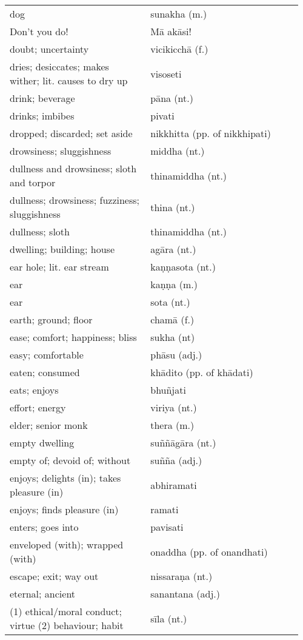 \documentclass[a5paper]{memoir}
\begin{document}
\begin{longtable}{L{0.48\linewidth} L{0.48\linewidth} H}
dog & sunakha (m.) & \\
Don't you do! & Mā akāsi! & \\
doubt; uncertainty & vicikicchā (f.) & \\
dries; desiccates; makes wither; lit. causes to dry up & visoseti & \\
drink; beverage & pāna (nt.) & \\
drinks; imbibes & pivati & \\
dropped; discarded; set aside & nikkhitta (pp. of nikkhipati) & \\
drowsiness; sluggishness & middha (nt.) & \\
dullness and drowsiness; sloth and torpor & thinamiddha (nt.) & \\
dullness; drowsiness; fuzziness; sluggishness & thina (nt.) & \\
dullness; sloth & thinamiddha (nt.) & \\
dwelling; building; house & agāra (nt.) & \\
ear hole; lit. ear stream & kaṇṇasota (nt.) & \\
ear & kaṇṇa (m.) & \\
ear & sota (nt.) & \\
earth; ground; floor & chamā (f.) & \\
ease; comfort; happiness; bliss & sukha (nt) & \\
easy; comfortable & phāsu (adj.) & \\
eaten; consumed & khādito (pp. of khādati) & \\
eats; enjoys & bhuñjati & \\
effort; energy & viriya (nt.) & \\
elder; senior monk & thera (m.) & \\
empty dwelling & suññāgāra (nt.) & \\
empty of; devoid of; without & suñña (adj.) & \\
enjoys; delights (in); takes pleasure (in) & abhiramati & \\
enjoys; finds pleasure (in) & ramati & \\
enters; goes into & pavisati & \\
enveloped (with); wrapped (with) & onaddha (pp. of onandhati) & \\
escape; exit; way out & nissaraṇa (nt.) & \\
eternal; ancient & sanantana (adj.) & \\
(1) ethical/moral conduct; virtue (2) behaviour; habit & sīla (nt.) & \\

\end{longtable}
\end{document}
